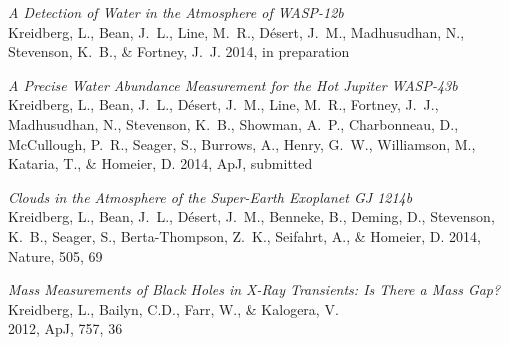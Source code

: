 \documentclass[12pt,letterpaper]{article}
\renewenvironment{itemize}{
	\begin{list}{}{
	\setlength{\leftmargin}{1mm}%
	\setlength{\itemsep}{0pt}%
	\setlength{\parskip}{0pt}
	}
}{
	\end{list}
}
\begin{document}
\begin{itemize}
\item \textit{A Detection of Water in the Atmosphere of WASP-12b}\\
Kreidberg, L., Bean, J.~L., Line, M.~R., D\'{e}sert, J.~M., Madhusudhan, N., Stevenson, K.~B., \& Fortney, J.~J.
2014, in preparation

\item \textit{A Precise Water Abundance Measurement for the Hot Jupiter WASP-43b}\\
Kreidberg, L., Bean, J.~L., D\'{e}sert, J.~M., Line, M.~R., Fortney, J.~J., Madhusudhan, N., Stevenson, K.~B., Showman, A.~P., Charbonneau, D., McCullough, P.~R., Seager, S., Burrows, A., Henry, G.~W., Williamson, M., Kataria, T., \& Homeier, D.
2014, ApJ, submitted

\item \textit{Clouds in the Atmosphere of the Super-Earth Exoplanet GJ 1214b}\\
Kreidberg, L., Bean, J.~L., D\'{e}sert, J.~M., Benneke, B., Deming, D., Stevenson, K.~B., Seager, S., Berta-Thompson, Z.~K., Seifahrt, A., \& Homeier, D.
2014, Nature, 505, 69

\item \textit{Mass Measurements of Black Holes in X-Ray Transients:  Is There a Mass Gap?}\\
Kreidberg, L., Bailyn, C.D., Farr, W., \& Kalogera, V. \\
2012, ApJ, 757, 36 

\end{itemize}
\end{document}
